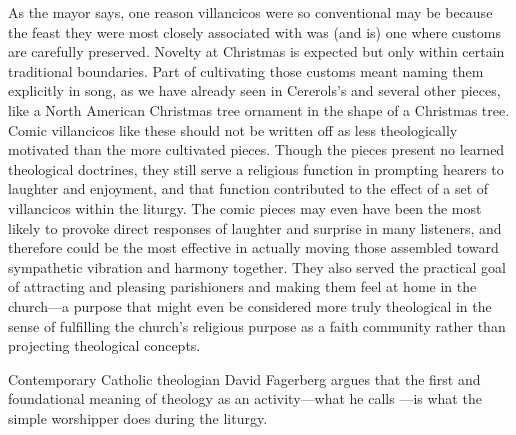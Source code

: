As the mayor says, one reason villancicos were so conventional may be because
the feast they were most closely associated with was (and is) one where customs
are carefully preserved.
Novelty at Christmas is expected but only within certain traditional
boundaries.
Part of cultivating those customs meant naming them explicitly in song, as we
have already seen in Cererols's  and several
other pieces, like a North American Christmas tree ornament in the shape of a
Christmas tree.
Comic villancicos like these should not be written off as less theologically
motivated than the more cultivated pieces.
Though the  pieces present no learned theological
doctrines, they still serve a religious function in prompting hearers to
laughter and enjoyment, and that function contributed to the effect of a set of
villancicos within the liturgy.
The comic pieces may even have been the most likely to provoke direct responses
of laughter and surprise in many listeners, and therefore could be the most
effective in actually moving those assembled toward sympathetic vibration and
harmony together. 
They also served the practical goal of attracting and pleasing parishioners and
making them feel at home in the church---a purpose that might even be
considered more truly theological in the sense of fulfilling the church's
religious purpose as a faith community rather than projecting theological
concepts.%
\begin{Footnote}
    Contemporary Catholic theologian David Fagerberg argues that the first
    and foundational meaning of theology as an activity---what he calls
    ---is what the simple worshipper does during the
    liturgy.
\end{Footnote}

\endinput

\subsection{Abstract References to Music as Concept or Symbol}

In the second category of metamusical villancicos are pieces that refer to music more as an abstract concept, rather than to a specific, identifiable reference to another kind of music.
When Pedro Ruimonte in \wtitle{Gil, pues a cantar} sets the word \foreign{cantar} \gloss{sing} to a long melisma, or when Gaspar Fernández in \wtitle{Sobre bro canto llano} illustrates the phrase {canto llano} \gloss{plainchant} with imitative counterpoint around a cantus-firmus-like Tenor part, the composer is using these characteristic emblems of vocal music to refer to the concept of singing in general.%
	\footnote{%
	See note~\ref{fn:Ruimonte} above.
	}
In doing so they are asking their singers to sing about singing.

